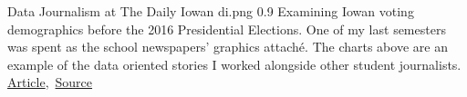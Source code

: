 \cvexample
  {Data Journalism at The Daily Iowan}
  {di.png}
  {0.9}
  {%
    Examining Iowan voting demographics before the 2016 Presidential Elections.
    One of my last semesters was spent as the school newspapers' graphics attaché.
    The charts above are an example of the data oriented stories I worked alongside other student journalists.\\
    \raggedleft\href{http://daily-iowan.com/2016/11/02/el-voto/}{Article},\, \href{https://github.com/ryan-p-larson/DI-Hisp}{Source}\quad
  }